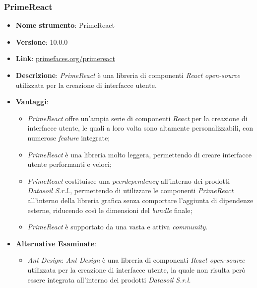 \subsubsection{PrimeReact}
\begin{itemize}
      \item \textbf{Nome strumento}: PrimeReact
      \item \textbf{Versione}: 10.0.0
      \item \textbf{Link}: \href{https://primefaces.org/primereact}{primefaces.org/primereact}
      \item \textbf{Descrizione}: \textit{PrimeReact} è una libreria di componenti \textit{React open-source} utilizzata per la creazione di interfacce utente.
      \item \textbf{Vantaggi}:
            \begin{itemize}
                  \item \textit{PrimeReact} offre un'ampia serie di componenti \textit{React} per la creazione di interfacce utente, le quali a loro volta sono altamente personalizzabili, con numerose \textit{feature} integrate;
                  \item \textit{PrimeReact} è una libreria molto leggera, permettendo di creare interfacce utente performanti e veloci;
                  \item \textit{PrimeReact} costituisce una \textit{\gls{peerdependency}\glox} all'interno dei prodotti \textit{Datasoil S.r.l.}, permettendo di utilizzare le componenti \textit{PrimeReact} all'interno
                        della libreria grafica senza comportare l'aggiunta di dipendenze esterne, riducendo così le dimensioni del \textit{bundle} finale;
                  \item \textit{PrimeReact} è supportato da una vasta e attiva \textit{community}.
            \end{itemize}
      \item \textbf{Alternative Esaminate}:
            \begin{itemize}
                  \item \textit{Ant Design}: \textit{Ant Design} è una libreria di componenti \textit{React open-source} utilizzata per la creazione di interfacce utente, la quale non risulta però
                        essere integrata all'interno dei prodotti \textit{Datasoil S.r.l.}
            \end{itemize}
\end{itemize}



